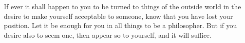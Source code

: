 If ever it shall  happen to you to be turned to things  of the outside world in
the desire to make yourself acceptable to someone, know that you have lost your
position. Let it  be enough for you in  all things to be a  philosopher. But if
you desire also to seem one, then appear so to yourself, and it will suffice.
